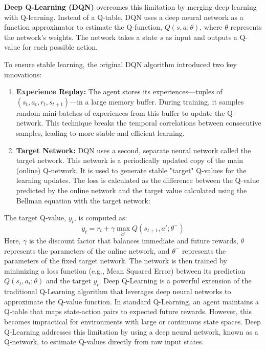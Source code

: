 \documentclass[12pt]{report}
\begin{document}
\textbf{Deep Q-Learning (DQN)} overcomes this limitation by merging deep learning with Q-learning. Instead of a Q-table, DQN uses a deep neural network as a function approximator to estimate the Q-function, $Q(s, a; \theta)$, where $\theta$ represents the network's weights. The network takes a state $s$ as input and outputs a Q-value for each possible action.

To ensure stable learning, the original DQN algorithm introduced two key innovations:
\begin{enumerate}
    \item \textbf{Experience Replay:} The agent stores its experiences—tuples of $(s_t, a_t, r_t, s_{t+1})$—in a large memory buffer. During training, it samples random mini-batches of experiences from this buffer to update the Q-network. This technique breaks the temporal correlations between consecutive samples, leading to more stable and efficient learning.
    \item \textbf{Target Network:} DQN uses a second, separate neural network called the target network. This network is a periodically updated copy of the main (online) Q-network. It is used to generate stable "target" Q-values for the learning updates. The loss is calculated as the difference between the Q-value predicted by the online network and the target value calculated using the Bellman equation with the target network:
\end{enumerate}

The target Q-value, $y_t$, is computed as:
\begin{equation}
y_t = r_t + \gamma \max_{a'} Q(s_{t+1}, a'; \theta^-)
\end{equation}
Here, $\gamma$ is the discount factor that balances immediate and future rewards, $\theta$ represents the parameters of the online network, and $\theta^-$ represents the parameters of the fixed target network. The network is then trained by minimizing a loss function (e.g., Mean Squared Error) between its prediction $Q(s_t, a_t; \theta)$ and the target $y_t$.
 Deep Q-Learning is a powerful extension of the traditional Q-Learning algorithm that leverages deep neural networks to approximate the Q-value function. In standard Q-Learning, an agent maintains a Q-table that maps state-action pairs to expected future rewards. However, this becomes impractical for environments with large or continuous state spaces. Deep Q-Learning addresses this limitation by using a deep neural network, known as a Q-network, to estimate Q-values directly from raw input states.
\end{document}
